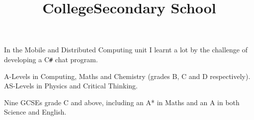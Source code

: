 \documentclass[line,margin]{res}
\newcommand{\CSharp}{C\texttt{\#}}
\begin{document}
\begin{resume}
\begin{position}
In the Mobile and Distributed Computing unit I learnt a lot by the challenge of developing a {\CSharp} chat program.
\end{position}

\title{College}
\begin{position}
A-Levels in Computing, Maths and Chemistry (grades B, C and D respectively). \\
AS-Levels in Physics and Critical Thinking.

\begin{comment}
\begin{tabular}{ l r r }
	Computing & A Level & B \\
	Maths & A Level & C \\
	Chemistry & A Level & D \\
	Physics & AS Level & D \\
	Critical Thinking & AS Level & E \\
\end{tabular}
\end{comment}
\end{position}

\title{Secondary School}
\begin{position}
Nine GCSEs grade C and above, including an A* in Maths and an A in both Science and English.

\begin{comment}
\begin{tabular}{ l r r }
	Mathematics & (a year early) GCSE & A* \\
	Science & Double Award GCSE & AA \\
	English & GCSE & A \\
	History & GCSE & B \\
	Systems \& Control & GCSE & B \\
	ICT & Short Course GCSE & C \\
	Statistics & GCSE & C \\
	English Literature & GCSE & C \\
	Geography & GCSE & D \\
	Drama & GCSE & F \\
\end{tabular}
\end{comment}
\end{position}


\end{resume}
\end{document}
